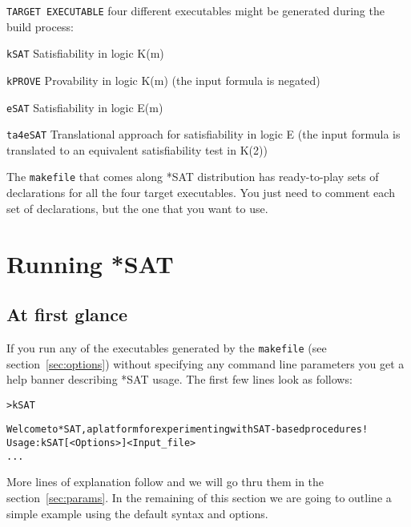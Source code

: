 \documentclass[12pt]{report}
\begin{document}
\begin{description}
	\item{\tt TARGET EXECUTABLE} four different executables might
	be generated during the build process:
	\begin{description}
		\item{\tt kSAT}    Satisfiability in logic K(m) 
		\item{\tt kPROVE}  Provability in logic K(m) (the input formula is negated)
		\item{\tt eSAT}    Satisfiability in logic E(m)
		\item{\tt ta4eSAT} Translational approach for satisfiability in logic E
		(the input formula is translated to an equivalent satisfiability
		test in K(2))
	\end{description}
	The {\tt makefile} that comes along *SAT
	distribution has ready-to-play sets of declarations for all the four
	target executables. You just need to comment each set of
	declarations, but the one that you want to use.
\end{description}	

\chapter{Running *SAT}

\section{At first glance}
\label{sec:first}

If you run any of the executables generated by the {\tt makefile} (see
section~\ref{sec:options}) without specifying any command line
parameters you get a help banner describing *SAT usage. 
The first few lines look as follows:
\begin{alltt}
\footnotesize
> kSAT

Welcome to *SAT, a platform for experimenting with SAT-based procedures!
Usage: kSAT [<Options>] <Input_file>
...
\end{alltt}
More lines of explanation follow and we will go thru them in the
section~\ref{sec:params}. In the remaining of this section
we are going to outline a simple example using the
default syntax and options.
\end{document}
